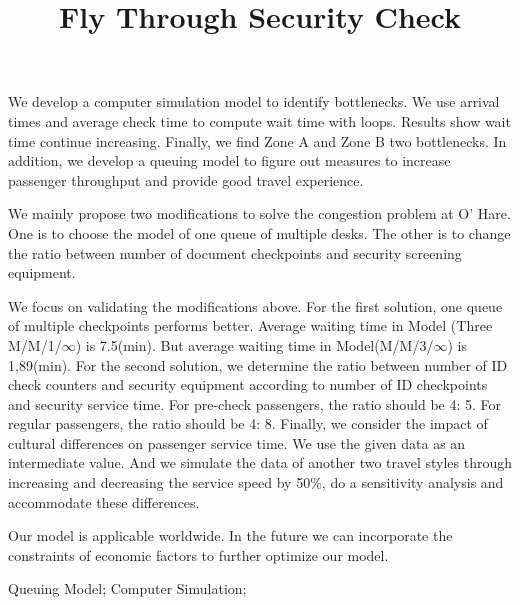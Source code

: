 \documentclass{mcmthesis}
\title{Fly Through Security Check}
\begin{document}
\begin{sheetsummary}
\par We develop a computer simulation model to identify bottlenecks. We use arrival times and average check time to compute wait time with loops. Results show wait time continue increasing. Finally, we find Zone A and Zone B two bottlenecks. In addition, we develop a queuing model to figure out measures to increase passenger throughput and provide good travel experience. 
\par We mainly propose two modifications to solve the congestion problem at O’ Hare. One is to choose the model of one queue of multiple desks. The other is to change the ratio between number of document checkpoints and security screening equipment.

\par We focus on validating the modifications above. For the first solution, one queue of multiple checkpoints performs better. Average waiting time in Model (Three M/M/1/$\infty$) is 7.5(min). But average waiting time in Model(M/M/3/$\infty$) is 1,89(min). For the second solution, we determine the ratio between number of ID check counters and security equipment according to number of ID checkpoints and security service time. For pre-check passengers, the ratio should be 4: 5. For regular passengers, the ratio should be 4: 8. Finally, we consider the impact of cultural differences on passenger service time. We use the given data as an intermediate value. And we simulate the data of another two travel styles through increasing and decreasing the service speed by 50\%, do a sensitivity analysis and accommodate these differences.
\par Our model is applicable worldwide. In the future we can incorporate the constraints of economic factors to further optimize our model.
\end{sheetsummary}

\begin{abstract}
\end{abstract}

\begin{keywords}
Queuing Model; Computer Simulation; 
\end{keywords}

\maketitle
\tableofcontents
\newpage
\end{document}
